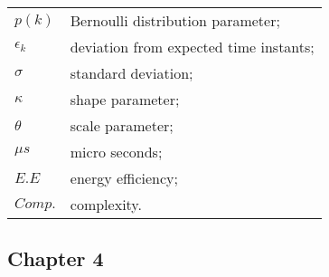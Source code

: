 \begin{longtable}{ll}
	$p(k)$					& Bernoulli distribution parameter; \\
	$\epsilon_k$			& deviation from expected time instants; \\
	$\sigma$				& standard deviation; \\
	$\kappa$				& shape parameter; \\
	$\theta$				& scale parameter; \\
	
	$\mu s$					& micro seconds; \\
	$E.E$					& energy efficiency; \\
	$Comp.$					& complexity. \\

\end{longtable}


\subsection*{Chapter 4}

